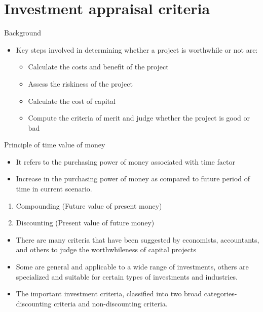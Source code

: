 \documentclass[12pt,ignorenonframetext,aspectratio=169]{beamer}
\providecommand{\tightlist}{%
  \setlength{\itemsep}{0pt}\setlength{\parskip}{0pt}}
\begin{document}
\hypertarget{investment-appraisal-criteria}{%
\section{Investment appraisal
criteria}\label{investment-appraisal-criteria}}

\begin{frame}{Background}
\protect\hypertarget{background-1}{}
\begin{itemize}
\tightlist
\item
  Key steps involved in determining whether a project is worthwhile or
  not are:

  \begin{itemize}
  \tightlist
  \item
    Calculate the costs and benefit of the project
  \item
    Assess the riskiness of the project
  \item
    Calculate the cost of capital
  \item
    Compute the criteria of merit and judge whether the project is good
    or bad
  \end{itemize}
\end{itemize}
\end{frame}

\begin{frame}{Principle of time value of money}
\protect\hypertarget{principle-of-time-value-of-money}{}
\begin{itemize}
\tightlist
\item
  It refers to the purchasing power of money associated with time factor
\item
  Increase in the purchasing power of money as compared to future period
  of time in current scenario.
\end{itemize}

\begin{enumerate}
\tightlist
\item
  Compounding (Future value of present money)
\item
  Discounting (Present value of future money)
\end{enumerate}
\end{frame}

\begin{frame}{}
\protect\hypertarget{section-5}{}
\begin{itemize}
\tightlist
\item
  There are many criteria that have been suggested by economists,
  accountants, and others to judge the worthwhileness of capital
  projects
\item
  Some are general and applicable to a wide range of investments, others
  are specialized and suitable for certain types of investments and
  industries.
\item
  The important investment criteria, classified into two broad
  categories-discounting criteria and non-discounting criteria.
\end{itemize}
\end{frame}
\end{document}
